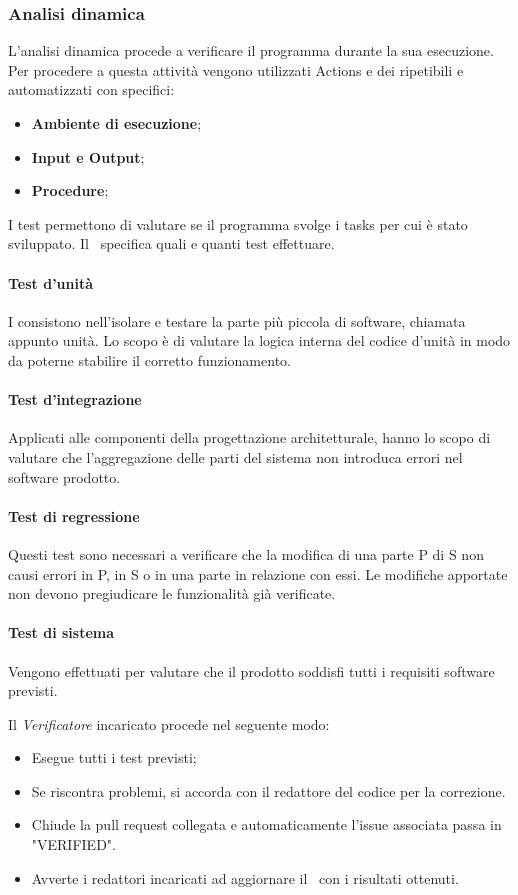 \subsubsection{Analisi dinamica}
L'analisi dinamica procede a verificare il programma durante la sua esecuzione. Per procedere a questa attività vengono utilizzati  Actions e dei  ripetibili e automatizzati con specifici:
\begin{itemize}
	\item \textbf{Ambiente di esecuzione};
	\item \textbf{Input e Output};
	\item \textbf{Procedure};
\end{itemize}

\label{Tests}I test permettono di valutare se il programma svolge i tasks per cui è stato sviluppato. Il \PdQv{}\ specifica quali e quanti test effettuare.
\paragraph*{Test d'unità}
I  consistono nell'isolare e testare la parte più piccola di software, chiamata appunto unità. Lo scopo è di valutare la logica interna del codice d'unità in modo da poterne stabilire il corretto funzionamento. 
\paragraph*{Test d'integrazione}
Applicati alle componenti della progettazione architetturale, hanno lo scopo di valutare che l'aggregazione delle parti del sistema non introduca errori nel software prodotto.
\paragraph*{Test di regressione}
Questi test sono necessari a verificare che la modifica di una parte P di S non causi errori in P, in S o in una parte in relazione con essi. Le modifiche apportate non devono pregiudicare le funzionalità già verificate. 
\paragraph*{Test di sistema}
Vengono effettuati per valutare che il prodotto soddisfi tutti i requisiti software previsti.

\label{ProceduraVerifica}Il \textit{Verificatore} incaricato procede nel seguente modo:
\begin{itemize}
	\item Esegue tutti i test previsti;
	\item Se riscontra problemi, si accorda con il redattore del codice per la correzione. 
	\item Chiude la pull request collegata e automaticamente l'issue associata passa in "VERIFIED".
	\item Avverte i redattori incaricati ad aggiornare il \PdQv\ con i risultati ottenuti.
\end{itemize}